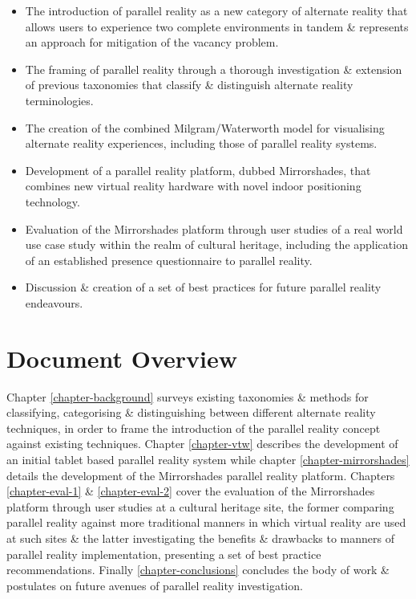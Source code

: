\begin{itemize}
	\item The introduction of parallel reality as a new category of alternate reality that allows users to experience two complete environments in tandem \& represents an approach for mitigation of the vacancy problem.
	\item The framing of parallel reality through a thorough investigation \& extension of previous taxonomies that classify \& distinguish alternate reality terminologies.
	\item The creation of the combined Milgram/Waterworth model for visualising alternate reality experiences, including those of parallel reality systems.
	\item Development of a parallel reality platform, dubbed Mirrorshades, that combines new virtual reality hardware with novel indoor positioning technology.
	\item Evaluation of the Mirrorshades platform through user studies of a real world use case study within the realm of cultural heritage, including the application of an established presence questionnaire to parallel reality.
	\item Discussion \& creation of a set of best practices for future parallel reality endeavours.
\end{itemize}


\section{Document Overview}

Chapter \ref{chapter-background} surveys existing taxonomies \& methods for classifying, categorising \& distinguishing between different alternate reality techniques, in order to frame the introduction of the parallel reality concept against existing techniques. Chapter \ref{chapter-vtw} describes the development of an initial tablet based parallel reality system while chapter \ref{chapter-mirrorshades} details the development of the Mirrorshades parallel reality platform. Chapters \ref{chapter-eval-1} \& \ref{chapter-eval-2} cover the evaluation of the Mirrorshades platform through user studies at a cultural heritage site, the former comparing parallel reality against more traditional manners in which virtual reality are used at such sites \& the latter investigating the benefits \& drawbacks to manners of parallel reality implementation, presenting a set of best practice recommendations. Finally \ref{chapter-conclusions} concludes the body of work \& postulates on future avenues of parallel reality investigation.

